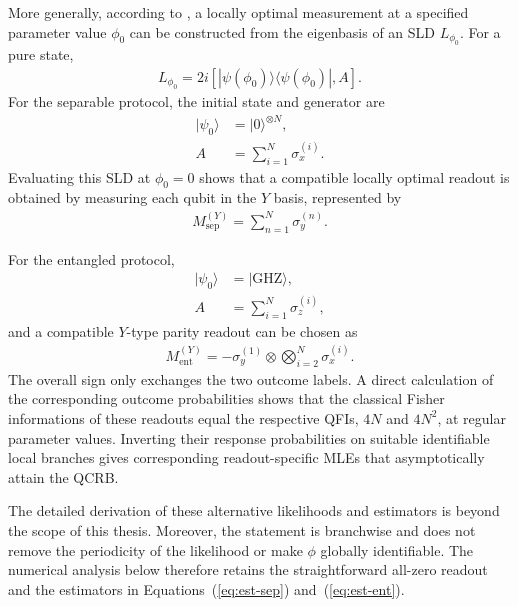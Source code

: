 More generally, according to \cite{tothQuantumMetrologyQuantum2014}, a locally optimal measurement at a specified parameter value $\phi_0$ can be constructed from the eigenbasis of an SLD $L_{\phi_0}$. For a pure state,
\begin{align}
    L_{\phi_0}
    =
    2i\left[
        |\psi(\phi_0)\rangle\langle\psi(\phi_0)|,A
    \right].
    \label{eq:sld}
\end{align}
For the separable protocol, the initial state and generator are
\begin{align}
    |\psi_0\rangle &= |0\rangle^{\otimes N}, \\
    A &= \sum_{i=1}^{N}\sigma_x^{(i)}.
\end{align}
Evaluating this SLD at $\phi_0=0$ shows that a compatible locally optimal readout is obtained by measuring each qubit in the $Y$ basis, represented by
\begin{align}
    M_{\mathrm{sep}}^{(Y)}
    =
    \sum_{n=1}^{N}\sigma_y^{(n)}.
\end{align}

For the entangled protocol,
\begin{align}
    |\psi_0\rangle &= |\mathrm{GHZ}\rangle, \\
    A &= \sum_{i=1}^{N}\sigma_z^{(i)},
\end{align}
and a compatible $Y$-type parity readout can be chosen as
\begin{align}
    M_{\mathrm{ent}}^{(Y)}
    =
    -\sigma_y^{(1)}
    \otimes
    \bigotimes_{i=2}^{N}\sigma_x^{(i)}.
\end{align}
The overall sign only exchanges the two outcome labels. A direct calculation of the corresponding outcome probabilities shows that the classical Fisher informations of these readouts equal the respective QFIs, $4N$ and $4N^2$, at regular parameter values. Inverting their response probabilities on suitable identifiable local branches gives corresponding readout-specific MLEs that asymptotically attain the QCRB.

The detailed derivation of these alternative likelihoods and estimators is beyond the scope of this thesis. Moreover, the statement is branchwise and does not remove the periodicity of the likelihood or make $\phi$ globally identifiable. The numerical analysis below therefore retains the straightforward all-zero readout and the estimators in Equations~(\ref{eq:est-sep}) and~(\ref{eq:est-ent}).




